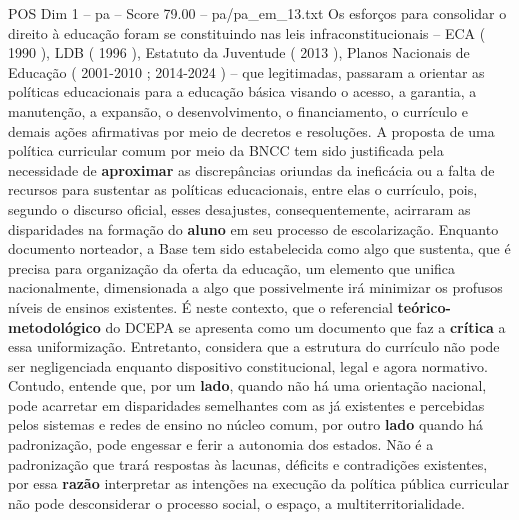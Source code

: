 \begin{textsample}{POS Dim 1 – pa – Score 79.00 – pa/pa\_em\_13.txt}
Os esforços para consolidar o direito à educação foram se constituindo nas leis infraconstitucionais – ECA ( 1990 ), LDB ( 1996 ), Estatuto da Juventude ( 2013 ), Planos Nacionais de Educação ( 2001-2010 ; 2014-2024 ) – que legitimadas, passaram a orientar as políticas educacionais para a educação básica visando o acesso, a garantia, a manutenção, a expansão, o desenvolvimento, o financiamento, o currículo e demais ações afirmativas por meio de decretos e resoluções.
A proposta de uma política curricular comum por meio da BNCC tem sido justificada pela necessidade de \textbf{aproximar} as discrepâncias oriundas da ineficácia ou a falta de recursos para sustentar as políticas educacionais, entre elas o currículo, pois, segundo o discurso oficial, esses desajustes, consequentemente, acirraram as disparidades na formação do \textbf{aluno} em seu processo de escolarização.
Enquanto documento norteador, a Base tem sido estabelecida como algo que sustenta, que é precisa para organização da oferta da educação, um elemento que unifica nacionalmente, dimensionada a algo que possivelmente irá minimizar os profusos níveis de ensinos existentes.
É neste contexto, que o referencial \textbf{teórico-metodológico} do DCEPA se apresenta como um documento que faz a \textbf{crítica} a essa uniformização.
Entretanto, considera que a estrutura do currículo não pode ser negligenciada enquanto dispositivo constitucional, legal e agora normativo.
Contudo, entende que, por um \textbf{lado}, quando não há uma orientação nacional, pode acarretar em disparidades semelhantes com as já existentes e percebidas pelos sistemas e redes de ensino no núcleo comum, por outro \textbf{lado} quando há padronização, pode engessar e ferir a autonomia dos estados.
Não é a padronização que trará respostas às lacunas, déficits e contradições existentes, por essa \textbf{razão} interpretar as intenções na execução da política pública curricular não pode desconsiderar o processo social, o espaço, a multiterritorialidade.

\end{textsample}
